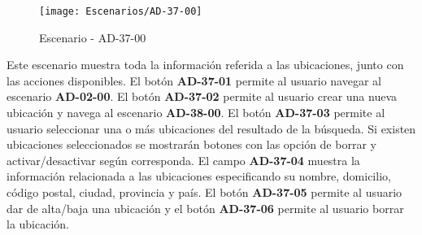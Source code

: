 \begin{figure}[H]
\centering
\texttt{[image: Escenarios/AD-37-00]}
\caption{Escenario - AD-37-00}
\label{fig:AD-37-00}
\end{figure}

Este escenario muestra toda la información referida a las ubicaciones, junto con las acciones disponibles.
El botón \textbf{AD-37-01} permite al usuario navegar al escenario \textbf{AD-02-00}. El botón \textbf{AD-37-02} permite al usuario crear una nueva ubicación y navega al escenario \textbf{AD-38-00}.
El botón \textbf{AD-37-03} permite al usuario seleccionar una o más ubicaciones del resultado de la búsqueda. Si existen ubicaciones seleccionados se mostrarán botones con las opción de borrar y activar/desactivar según corresponda. El campo \textbf{AD-37-04} muestra la información relacionada a las ubicaciones especificando su nombre, domicilio, código postal, ciudad, provincia y país. El botón \textbf{AD-37-05} permite al usuario dar de alta/baja una ubicación y el botón \textbf{AD-37-06} permite al usuario borrar la ubicación.
\clearpage
